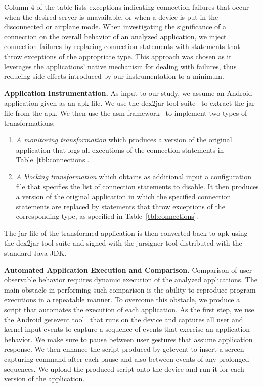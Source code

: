Column 4 of the table lists exceptions indicating connection failures that occur when the desired server is unavailable, or when a device is put in the disconnected or airplane mode. 
When investigating the significance of a connection on the overall behavior of an analyzed application, we inject connection failures by replacing connection statements with statements that throw exceptions of the appropriate type. 
This approach was chosen as it leverages the applications' native mechanism for dealing with failures, thus reducing side-effects introduced by our instrumentation to a minimum.

\vspace{0.1in}
\noindent 
{\bf Application Instrumentation.}
As input to our study, we assume an Android application given as an apk file. 
We use the dex2jar tool suite~\cite{dex2jar} to extract the jar file from the apk.
We then use the asm framework~\cite{asm} to implement two types of transformations: 
\begin{enumerate}[leftmargin=0.5cm]\setlength{\itemsep}{-0.05in}
\item \emph{A monitoring transformation} which produces a version of the original application that logs all executions of the connection statements in Table~\ref{tbl:connections}. 
\item \emph{A blocking transformation} which obtains as additional input a configuration file that specifies the list of connection statements to disable. It then produces a version of the original application in which the specified connection statements are replaced by statements that throw exceptions of the corresponding type, as specified in Table~\ref{tbl:connections}.
\end{enumerate}
The jar file of the transformed application is then converted back to apk using the dex2jar tool suite and signed with the jarsigner tool distributed with the standard Java JDK.
 

\vspace{0.1in}
\noindent 
{\bf Automated Application Execution and Comparison.}
Comparison of user-observable behavior requires dynamic execution of the analyzed applications. 
The main obstacle in performing such comparison is the ability to reproduce program executions in a repeatable manner. 
To overcome this obstacle, we produce a script that automates the execution of each application.
As the first step, we use the Android getevent tool~\cite{getevent} that runs on the device and captures all user and kernel input events to capture a sequence of events that exercise an application behavior. We make sure to pause between user gestures that assume application response. 
We then enhance the script produced by getevent to insert a screen capturing command after each pause and also between events of any prolonged sequences. 
We upload the produced script onto the device and run it for each version of the application. 

